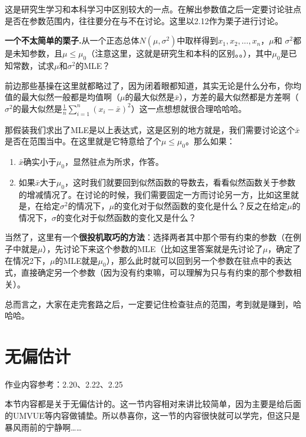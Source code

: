 \documentclass[10pt, a4paper]{article}
\begin{document}
这是研究生学习和本科学习中区别较大的一点。在解出参数值之后一定要讨论驻点是否在参数范围内，往往要分在与不在讨论。这里以2.12作为栗子进行讨论。\\\par

\textbf{一个不太简单的栗子.}从一个正态总体$N(\mu, \sigma^2)$中取样得到$x_1,x_2,...,x_n$，$\mu$和 $\sigma^2$都是未知参数，且$\mu \leq \mu_0$（注意这里，这就是研究生和本科的区别。。），其中$\mu_0$是已知常数，试求$\mu$和$\sigma^2$的MLE？\\\par
前边那些基操在这里就都略过了，因为闭着眼都知道，其实无论是什么分布，你均值的最大似然一般都是均值啊（$\mu$的最大似然是$\bar x$），方差的最大似然都是方差啊（$\sigma^2$的最大似然是$\frac{1}{n} \sum_{i=1}^n (x_i-\bar{x})^2$）这一点想想就很合理哈哈哈。\par
那假装我们求出了MLE是以上表达式，这是区别的地方就是，我们需要讨论这个$\bar x$是否在范围当中。在这里就是它特意给了个$\mu \leq \mu_0$。那么如果：
\begin{enumerate}
    \item $\bar{x}$确实小于$\mu_0$，显然驻点为所求，作答。
    \item 如果$\bar{x}$大于$\mu_0$，这时我们就要回到似然函数的导数去，看看似然函数关于参数的增减情况了。在讨论的时候，我们需要固定一方而讨论另一方，比如这里就是，在给定$\sigma^2$的情况下，$\mu$的变化对于似然函数的变化是什么？反之在给定$\mu$的情况下，$\sigma$的变化对于似然函数的变化又是什么？
\end{enumerate} \par
当然了，这里有一个\textbf{很投机取巧的方法}：选择两者其中那个带有约束的参数（在例子中就是$\mu$），先讨论下来这个参数的MLE（比如这里答案就是先讨论了$\mu$，确定了在情况2下，$\mu$的MLE就是$\mu_0$），那么此时就可以回到另一个参数在驻点中的表达式，直接确定另一个参数（因为没有约束嘛，可以理解为只与有约束的那个参数相关）。\par
总而言之，大家在走完套路之后，一定要记住检查驻点的范围，考到就是赚到，哈哈哈。\par

\section{无偏估计}
作业内容参考：2.20、2.22、2.25\par
本节内容都是关于无偏估计的。这一节内容相对来讲比较简单，因为主要是给后面的UMVUE等内容做铺垫。所以恭喜你，这一节的内容很快就可以学完，但这只是暴风雨前的宁静啊……\par
\end{document}

